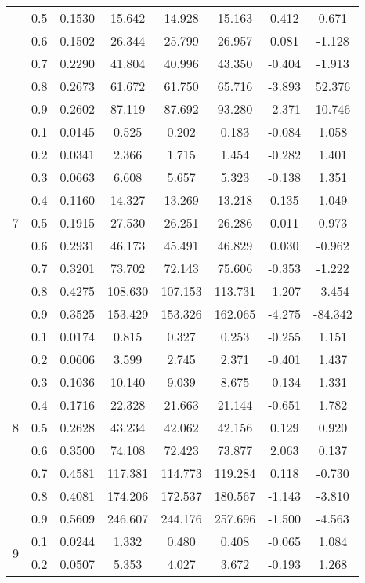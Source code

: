 \documentclass[11pt,a4paper]{report}
\begin{document}
\begin{longtable}{ | c | c || c | c | c | c | c | c | }
 & 0.5 & 0.1530 & 15.642 & 14.928 & 15.163 & 0.412 & 0.671 \\
 & 0.6 & 0.1502 & 26.344 & 25.799 & 26.957 & 0.081 & -1.128 \\
 & 0.7 & 0.2290 & 41.804 & 40.996 & 43.350 & -0.404 & -1.913 \\
 & 0.8 & 0.2673 & 61.672 & 61.750 & 65.716 & -3.893 & 52.376 \\
 & 0.9 & 0.2602 & 87.119 & 87.692 & 93.280 & -2.371 & 10.746 \\
 \hline
\multirow{9}{*}{7} & 0.1 & 0.0145 & 0.525 & 0.202 & 0.183 & -0.084 & 1.058 \\
 & 0.2 & 0.0341 & 2.366 & 1.715 & 1.454 & -0.282 & 1.401 \\
 & 0.3 & 0.0663 & 6.608 & 5.657 & 5.323 & -0.138 & 1.351 \\
 & 0.4 & 0.1160 & 14.327 & 13.269 & 13.218 & 0.135 & 1.049 \\
 & 0.5 & 0.1915 & 27.530 & 26.251 & 26.286 & 0.011 & 0.973 \\
 & 0.6 & 0.2931 & 46.173 & 45.491 & 46.829 & 0.030 & -0.962 \\
 & 0.7 & 0.3201 & 73.702 & 72.143 & 75.606 & -0.353 & -1.222 \\
 & 0.8 & 0.4275 & 108.630 & 107.153 & 113.731 & -1.207 & -3.454 \\
 & 0.9 & 0.3525 & 153.429 & 153.326 & 162.065 & -4.275 & -84.342 \\
 \hline
\multirow{9}{*}{8} & 0.1 & 0.0174 & 0.815 & 0.327 & 0.253 & -0.255 & 1.151 \\
 & 0.2 & 0.0606 & 3.599 & 2.745 & 2.371 & -0.401 & 1.437 \\
 & 0.3 & 0.1036 & 10.140 & 9.039 & 8.675 & -0.134 & 1.331 \\
 & 0.4 & 0.1716 & 22.328 & 21.663 & 21.144 & -0.651 & 1.782 \\
 & 0.5 & 0.2628 & 43.234 & 42.062 & 42.156 & 0.129 & 0.920 \\
 & 0.6 & 0.3500 & 74.108 & 72.423 & 73.877 & 2.063 & 0.137 \\
 & 0.7 & 0.4581 & 117.381 & 114.773 & 119.284 & 0.118 & -0.730 \\
 & 0.8 & 0.4081 & 174.206 & 172.537 & 180.567 & -1.143 & -3.810 \\
 & 0.9 & 0.5609 & 246.607 & 244.176 & 257.696 & -1.500 & -4.563 \\
 \hline
\multirow{9}{*}{9} & 0.1 & 0.0244 & 1.332 & 0.480 & 0.408 & -0.065 & 1.084 \\
 & 0.2 & 0.0507 & 5.353 & 4.027 & 3.672 & -0.193 & 1.268 \\

\end{longtable}
\end{document}
